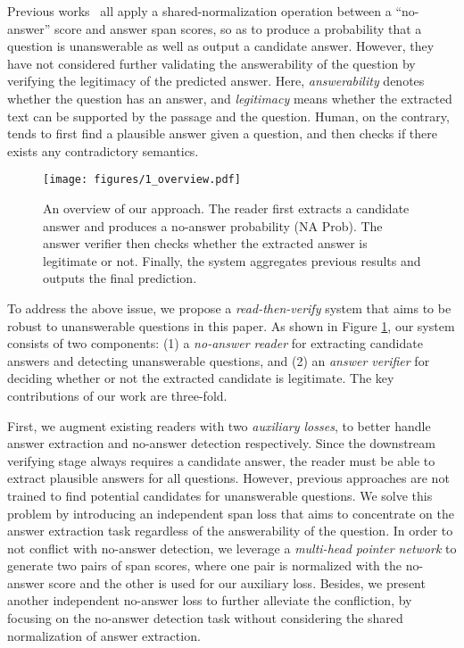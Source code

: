 \documentclass[letterpaper]{article} \usepackage{aaai19}  \usepackage{times}  \usepackage{helvet}  \usepackage{courier}  \usepackage{url}  \usepackage{graphicx}  \usepackage{pbox}
\begin{document}
Previous works~\cite{Levy17,Clark18,kundu2018nil} all apply a shared-normalization operation between a ``no-answer'' score and answer span scores, so as to produce a probability that a question is unanswerable as well as output a candidate answer.
However, they have not considered further validating the answerability of the question by verifying the legitimacy of the predicted answer.
Here, \emph{answerability} denotes whether the question has an answer, and \emph{legitimacy} means whether the extracted text can be supported by the passage and the question.
Human, on the contrary, tends to first find a plausible answer given a question, and then checks if there exists any contradictory semantics.

\begin{figure}
\begin{center}
\texttt{[image: figures/1\_overview.pdf]}
\vspace{-0.1cm}
\caption{An overview of our approach. 
The reader first extracts a candidate answer and produces a no-answer probability (NA Prob). The answer verifier then checks whether the extracted answer is legitimate or not. Finally, the system aggregates previous results and outputs the final prediction.
}
\label{fig1}
\vspace{-0.5cm}
\end{center}
\end{figure}

To address the above issue, we propose a \emph{read-then-verify} system that aims to be robust to unanswerable questions in this paper.
As shown in Figure \ref{fig1}, our system consists of two components: (1) a \emph{no-answer reader} for extracting candidate answers and detecting unanswerable questions, and (2) an \emph{answer verifier} for deciding whether or not the extracted candidate is legitimate. 
The key contributions of our work are three-fold.

First, we augment existing readers with two \emph{auxiliary losses}, to better handle answer extraction and no-answer detection respectively. 
Since the downstream verifying stage always requires a candidate answer, the reader must be able to extract plausible answers for all questions. 
However, previous approaches are not trained to find potential candidates for unanswerable questions.
We solve this problem by introducing an independent span loss that aims to concentrate on the answer extraction task regardless of the answerability of the question.
In order to not conflict with no-answer detection, we leverage a \emph{multi-head pointer network} to generate two pairs of span scores, where one pair is normalized with the no-answer score and the other is used for our auxiliary loss.
Besides, we present another independent no-answer loss to further alleviate the confliction, by focusing on the no-answer detection task without considering the shared normalization of answer extraction.
\end{document}
